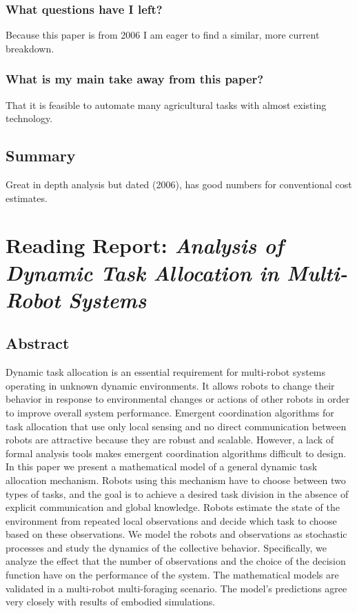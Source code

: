     \subsubsection*{What questions have I left?}
    Because this paper is from 2006 I am eager to find a similar, more current breakdown.
    \subsubsection*{What is my main take away from this paper?}
    That it is feasible to automate many agricultural tasks with almost existing technology.
    
    \subsection*{Summary}
    Great in depth analysis but dated (2006), has good numbers for conventional cost estimates.

    
    \newpage
    \section{Reading Report: \emph{Analysis of Dynamic Task Allocation in Multi-Robot Systems}}
    \label{sec:Lerman2006}
    \cite{Lerman2006}
    
    \subsection*{Abstract}
    Dynamic task allocation is an essential requirement for multi-robot
    systems operating in unknown dynamic environments. It allows
    robots to change their behavior in response to environmental changes
    or actions of other robots in order to improve overall system performance. Emergent coordination algorithms for task allocation that
    use only local sensing and no direct communication between robots
    are attractive because they are robust and scalable. However, a lack
    of formal analysis tools makes emergent coordination algorithms
    difficult to design. In this paper we present a mathematical model
    of a general dynamic task allocation mechanism. Robots using this
    mechanism have to choose between two types of tasks, and the goal
    is to achieve a desired task division in the absence of explicit communication and global knowledge. Robots estimate the state of the
    environment from repeated local observations and decide which task
    to choose based on these observations. We model the robots and observations as stochastic processes and study the dynamics of the collective behavior. Specifically, we analyze the effect that the number
    of observations and the choice of the decision function have on the
    performance of the system. The mathematical models are validated
    in a multi-robot multi-foraging scenario. The model’s predictions
    agree very closely with results of embodied simulations.
    
